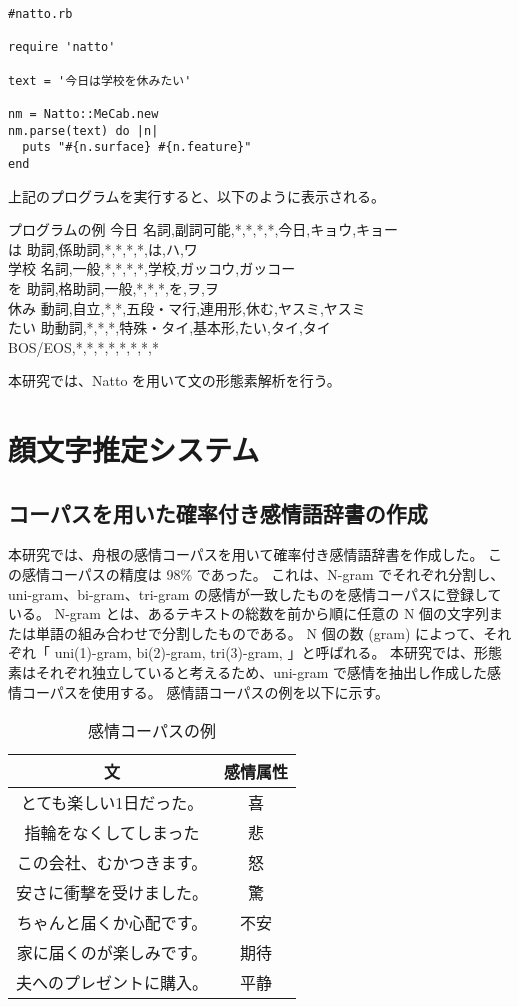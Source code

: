 \documentclass[11pt,a4j]{jsarticle}
\begin{document}
\begin{verbatim}
#natto.rb

require 'natto'

text = '今日は学校を休みたい'

nm = Natto::MeCab.new
nm.parse(text) do |n|
  puts "#{n.surface} #{n.feature}"
end
\end{verbatim}

上記のプログラムを実行すると、以下のように表示される。

\begin{itembox}[l]{プログラムの例}
  今日  名詞,副詞可能,*,*,*,*,今日,キョウ,キョー \\
  は  助詞,係助詞,*,*,*,*,は,ハ,ワ\\ 
  学校  名詞,一般,*,*,*,*,学校,ガッコウ,ガッコー\\
  を  助詞,格助詞,一般,*,*,*,を,ヲ,ヲ\\
  休み  動詞,自立,*,*,五段・マ行,連用形,休む,ヤスミ,ヤスミ\\
  たい  助動詞,*,*,*,特殊・タイ,基本形,たい,タイ,タイ\\
 BOS/EOS,*,*,*,*,*,*,*,*\\
\end{itembox}

本研究では、Natto を用いて文の形態素解析を行う。

\section{顔文字推定システム}\label{sec:theorem}
  \subsection{コーパスを用いた確率付き感情語辞書の作成}\label{sec:tweetcorpus}
本研究では、舟根の感情コーパスを用いて確率付き感情語辞書を作成した。
この感情コーパスの精度は 98\% であった。
これは、N-gram でそれぞれ分割し、uni-gram、bi-gram、tri-gram の感情が一致したものを感情コーパスに登録している。
N-gram とは、あるテキストの総数を前から順に任意の N 個の文字列または単語の組み合わせで分割したものである。
N 個の数 (gram) によって、それぞれ「 uni(1)-gram, bi(2)-gram, tri(3)-gram, \cdots 」と呼ばれる。
本研究では、形態素はそれぞれ独立していると考えるため、uni-gram で感情を抽出し作成した感情コーパスを使用する。
感情語コーパスの例を以下に示す。

\begin{table}[htb]
  \caption{感情コーパスの例}
  \centering
  \begin{tabular}{c|c} \hline
    文 & 感情属性 \\ \hline \hline
    とても楽しい1日だった。 & 喜 \\
    指輪をなくしてしまった & 悲 \\
    この会社、むかつきます。 & 怒 \\ 
    安さに衝撃を受けました。 & 驚 \\
    ちゃんと届くか心配です。 & 不安 \\
    家に届くのが楽しみです。 & 期待 \\
    夫へのプレゼントに購入。& 平静 \\ \hline
  \end{tabular}
\end{table}
\end{document}

